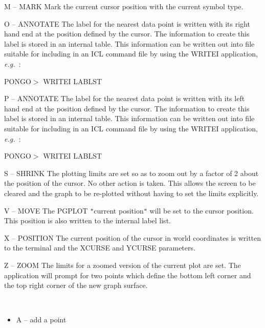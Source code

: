 \documentclass[twoside,11pt]{article}
\renewcommand{\_}{\texttt{\symbol{95}}}
\newcommand{\eg}{{\em e.g.\ }}
\newcommand{\sstitemlist}[1]{
  \mbox{} \\
  \vspace{-3.5ex}
  \begin{itemize}
     #1
  \end{itemize}
}
\newcommand{\sstitem}{\item}
\newcommand{\sstitemlist}[1]{
      \begin{itemize}
         #1
      \end{itemize}
      \\
   }
\newcommand{\sstitem}{\item}
\begin{document}
{{{         \sstitem
            M -- MARK
            Mark the current cursor position with the current symbol
            type.

         \sstitem
            O -- ANNOTATE
            The label for the nearest data point is written with its
            right hand end at the position defined by the cursor.  The
            information to create this label is stored in an internal
            table. This information can be written out into file
            suitable for including in an ICL command file by using the
            WRITEI application, \eg:

               PONGO$>$ WRITEI LABLST

         \sstitem
            P -- ANNOTATE
            The label for the nearest data point is written with its
            left hand end at the position defined by the cursor.  The
            information to create this label is stored in an internal
            table. This information can be written out into file
            suitable for including in an ICL command file by using the
            WRITEI application, \eg:

               PONGO$>$ WRITEI LABLST

         \sstitem
            S -- SHRINK
            The plotting limits are set so as to zoom out by a factor
            of 2 about the position of the cursor. No other action is
            taken. This allows the screen to be cleared and the graph
            to be re-plotted without having to set the limits
            explicitly.

         \sstitem
            V -- MOVE
            The PGPLOT {\tt "}current position{\tt "} will be set to the cursor
            position. This position is also written to the internal
            label list.

         \sstitem
            X -- POSITION
            The current position of the cursor in world coordinates is
            written to the terminal and the XCURSE and YCURSE
            parameters.

         \sstitem
            Z -- ZOOM
            The limits for a zoomed version of the current plot are
            set. The application will prompt for two points which
            define the bottom left corner and the top right corner of
            the new graph surface.

         \sstitemlist{

            \sstitem
                  A -- add a point

}}}}
\end{document}
